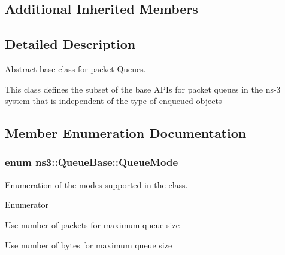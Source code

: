 \subsection*{Additional Inherited Members}


\subsection{Detailed Description}
Abstract base class for packet Queues. 

This class defines the subset of the base A\+P\+Is for packet queues in the ns-\/3 system that is independent of the type of enqueued objects 

\subsection{Member Enumeration Documentation}
\subsubsection[{\texorpdfstring{Queue\+Mode}{QueueMode}}]{\setlength{\rightskip}{0pt plus 5cm}enum {\bf ns3\+::\+Queue\+Base\+::\+Queue\+Mode}}\hypertarget{classns3_1_1QueueBase_adc473162c2a2bcb3d76d151d6d7ee02a}{}\label{classns3_1_1QueueBase_adc473162c2a2bcb3d76d151d6d7ee02a}


Enumeration of the modes supported in the class. 

\begin{Desc}
\item[Enumerator]\par
\begin{description}
\item[{\em 
Q\+U\+E\+U\+E\+\_\+\+M\+O\+D\+E\+\_\+\+P\+A\+C\+K\+E\+TS\hypertarget{classns3_1_1QueueBase_adc473162c2a2bcb3d76d151d6d7ee02aa68a809be7a09a4c4c7d8feb37f2f7a9d}{}\label{classns3_1_1QueueBase_adc473162c2a2bcb3d76d151d6d7ee02aa68a809be7a09a4c4c7d8feb37f2f7a9d}
}]Use number of packets for maximum queue size \item[{\em 
Q\+U\+E\+U\+E\+\_\+\+M\+O\+D\+E\+\_\+\+B\+Y\+T\+ES\hypertarget{classns3_1_1QueueBase_adc473162c2a2bcb3d76d151d6d7ee02aa141eeb76bf0704ba0fdb23b04ffc3453}{}\label{classns3_1_1QueueBase_adc473162c2a2bcb3d76d151d6d7ee02aa141eeb76bf0704ba0fdb23b04ffc3453}
}]Use number of bytes for maximum queue size \end{description}
\end{Desc}

